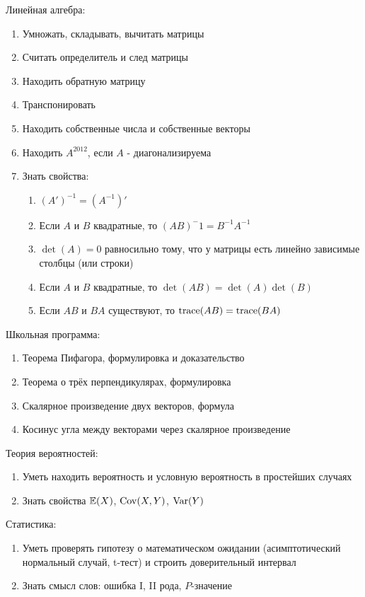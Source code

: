 \documentclass[12pt, a4paper]{article}
\begin{document}
Линейная алгебра:
\begin{enumerate}
\item Умножать, складывать, вычитать матрицы
\item Считать определитель и след матрицы
\item Находить обратную матрицу
\item Транспонировать
\item Находить собственные числа и собственные векторы
\item Находить $A^{2012}$, если $A$ - диагонализируема
\item Знать свойства:
\begin{enumerate}
\item $(A')^{-1}=(A^{-1})'$
\item Если $A$ и $B$ квадратные, то $(AB)^-1=B^{-1}A^{-1}$
\item $\det(A)=0$ равносильно тому, что у матрицы есть линейно зависимые столбцы (или строки)
\item Если $A$ и $B$ квадратные, то $\det(AB)=\det(A)\det(B)$
\item Если $AB$ и $BA$ существуют, то $\operatorname{trace}(AB)=\operatorname{trace}(BA)$
\end{enumerate}
\end{enumerate}

Школьная программа:
\begin{enumerate}
\item Теорема Пифагора, формулировка и доказательство
\item Теорема о трёх перпендикулярах, формулировка
\item Скалярное произведение двух векторов, формула
\item Косинус угла между векторами через скалярное произведение
\end{enumerate}

Теория вероятностей:
\begin{enumerate}
\item  Уметь находить вероятность и условную вероятность в простейших случаях
\item Знать свойства $\mathbb{E}(X)$, $\operatorname{Cov}(X,Y)$, $\operatorname{Var}(Y)$
\end{enumerate}

Статистика:
\begin{enumerate}
\item  Уметь проверять гипотезу о математическом ожидании (асимптотический нормальный случай, t-тест) и строить доверительный интервал
\item Знать смысл слов: ошибка I, II рода, $P$-значение
\end{enumerate}
\end{document}

